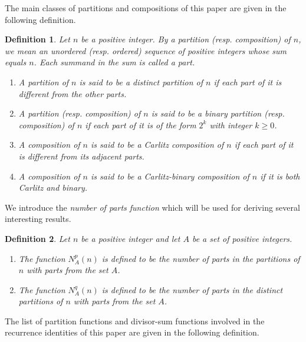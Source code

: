 \documentclass[11pt]{article}
\newtheorem{definition}{Definition}
\begin{document}
The main classes of partitions and compositions of this paper are given in the following definition. 
\begin{definition}
\normalfont 
Let $n$ be a positive integer. By a partition (resp. composition) of $n$, we mean an unordered (resp. ordered) sequence of positive integers whose sum equals $n$. Each summand in the sum is called a part. 
\begin{enumerate}
\item 
A partition of $n$ is said to be a \emph{distinct} partition of $n$ if each part of it is different from the other parts. 
\item 
A partition (resp. composition) of $n$ is said to be a \emph{binary} partition (resp. composition) of $n$ if each part of it is of the form $2^k$ with integer $k\geq 0$.
\item 
A composition of $n$ is said to be a \emph{Carlitz} composition of $n$ if each part of it is different from its adjacent parts. 
\item 
A composition of $n$ is said to be a \emph{Carlitz-binary} composition of $n$ if it is both Carlitz and binary. 
\end{enumerate} 
\end{definition}
We introduce the \emph{number of parts function} which will be used for deriving several interesting results.  
\begin{definition}
\normalfont 
Let $n$ be a positive integer and let $A$ be a set of positive integers.
\begin{enumerate}
\item 
The function $N^p_A(n)$ is defined to be the number of parts in the partitions of $n$ with parts from the set $A$.
\item The function $N^q_A(n)$ is defined to be the number of parts in the distinct partitions of $n$ with parts from the set $A$.
\end{enumerate}
\end{definition}
The list of partition functions and divisor-sum functions involved in the recurrence identities of this paper are given in the following definition.
\end{document}
